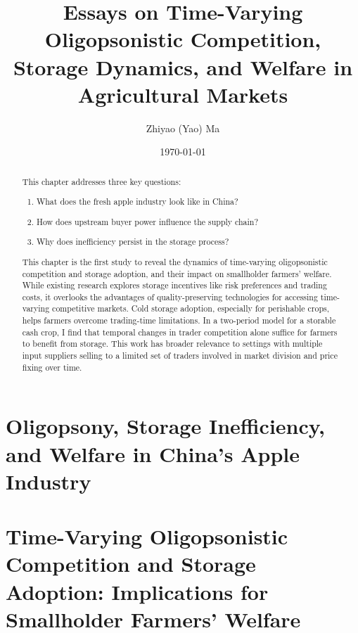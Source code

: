 \documentclass[12pt,authoryear, notitlepage]{elegantpaper}
\title{Essays on Time-Varying Oligopsonistic Competition, Storage Dynamics, and Welfare in Agricultural Markets}
\author{Zhiyao (Yao) Ma}
\institute{Committee: Richard J. Sexton, Jeffrey Williams, and Stephen Boucher}
\date{\today}
\begin{document}
\maketitle
\setcounter{tocdepth}{2}

\tableofcontents

\newpage
\chapter{Oligopsony, Storage Inefficiency, and Welfare in China’s Apple Industry}

\begin{abstract}
This chapter addresses three key questions:
\begin{enumerate}
    \item What does the fresh apple industry look like in China?
    \item How does upstream buyer power influence the supply chain?
    \item Why does inefficiency persist in the storage process?
\end{enumerate}
\end{abstract}






\newpage
\chapter{Time-Varying Oligopsonistic Competition and Storage Adoption: Implications for Smallholder Farmers' Welfare}

\begin{abstract}
This chapter is the first study to reveal the dynamics of time-varying oligopsonistic competition and storage adoption, and their impact on smallholder farmers' welfare. While existing research explores storage incentives like risk preferences and trading costs, it overlooks the advantages of quality-preserving technologies for accessing time-varying competitive markets. Cold storage adoption, especially for perishable crops, helps farmers overcome trading-time limitations. In a two-period model for a storable cash crop, I find that temporal changes in trader competition alone suffice for farmers to benefit from storage. This work has broader relevance to settings with multiple input suppliers selling to a limited set of traders involved in market division and price fixing over time.



\end{abstract}
\end{document}
